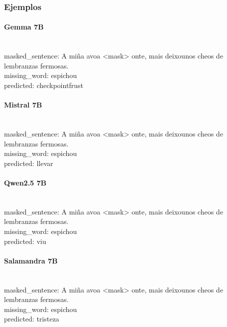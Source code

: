 \subsubsection{Ejemplos}

\paragraph{Gemma 7B}~\\
{masked\_sentence:} A miña avoa {\textless}mask{\textgreater} onte, mais deixounos cheos de lembranzas fermosas.\\
{missing\_word:} espichou\\
{predicted:} checkpointfrust\\

\paragraph{Mistral 7B}~\\
{masked\_sentence:} A miña avoa {\textless}mask{\textgreater} onte, mais deixounos cheos de lembranzas fermosas.\\
{missing\_word:} espichou\\
{predicted:} llevar\\

\paragraph{Qwen2.5 7B}~\\
{masked\_sentence:} A miña avoa {\textless}mask{\textgreater} onte, mais deixounos cheos de lembranzas fermosas.\\
{missing\_word:} espichou\\
{predicted:} viu\\

\paragraph{Salamandra 7B}~\\
{masked\_sentence:} A miña avoa {\textless}mask{\textgreater} onte, mais deixounos cheos de lembranzas fermosas.\\
{missing\_word:} espichou\\
{predicted:} tristeza\\

